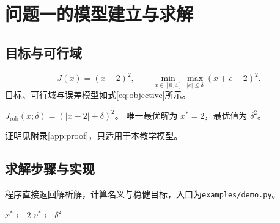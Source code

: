 \section{问题一的模型建立与求解}
\subsection{目标与可行域}
\begin{equation}\label{eq:objective}
 J(x)=(x-2)^2,\qquad
 \min_{x\in[0,4]}\max_{|e|\leq\delta}(x+e-2)^2.
\end{equation}
目标、可行域与误差模型如式\eqref{eq:objective}所示。
\begin{proposition}\label{prop:optimum}
$J_{\mathrm{rob}}(x;\delta)=(|x-2|+\delta)^2$。
唯一最优解为 $x^*=2$，最优值为 $\delta^2$。
\end{proposition}
证明见附录\ref{app:proof}，只适用于本教学模型。
\subsection{求解步骤与实现}
程序直接返回解析解，计算名义与稳健目标，入口为\texttt{examples/demo.py}。
\begin{algorithm}[htbp]
\caption{教学模型解析求解}
$x^*\leftarrow2$\;
$v^*\leftarrow\delta^2$\;
\;
\end{algorithm}
